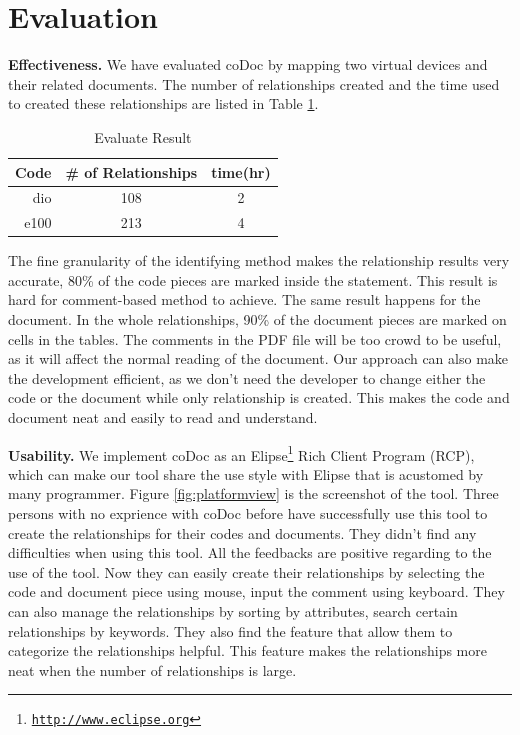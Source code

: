 \documentclass[11pt,letterpaper,oneside]{article}
\begin{document}
\section{Evaluation}
\label{sec:evaluation}
\textbf{Effectiveness.} We have evaluated coDoc by mapping two virtual devices and their related documents.
The number of relationships created and the time used to created these relationships are listed in Table \ref{table:evaluate}.

\begin{table}[th]
\caption{Evaluate Result}
\centering
\begin{tabular}{rcc}
\hline
Code & \# of Relationships & time(hr) \\
\hline
dio & 108 & 2 \\
e100  & 213 & 4\\
\hline
\end{tabular}
\label{table:evaluate}
\end{table}

The fine granularity of the identifying method makes the relationship results very accurate, 
80\% of the code pieces are marked inside the statement.
This result is hard for comment-based method to achieve.
The same result happens for the document.
In the whole relationships, 
90\% of the document pieces are marked on cells in the tables.
The comments in the PDF file will be too crowd to be useful,
as it will affect the normal reading of the document.
Our approach can also make the development efficient,
as we don't need the developer to change either the code or the document while only relationship is created.
This makes the code and document neat and easily to read and understand.

\noindent \textbf{Usability.} We implement coDoc as an Elipse\footnote{\texttt{\url{http://www.eclipse.org}}} Rich Client Program (RCP), 
which can make our tool share the use style with Elipse that is acustomed by many programmer.
Figure \ref{fig:platformview} is the screenshot of the tool.
Three persons with no exprience with coDoc before have successfully use this tool to create the relationships for their codes and documents.
They didn't find any difficulties when using this tool.
All the feedbacks are positive regarding to the use of the tool.
Now they can easily create their relationships by selecting the code and document piece using mouse, input the comment using keyboard.
They can also manage the relationships by sorting by attributes, search certain relationships by keywords.
They also find the feature that allow them to categorize the relationships helpful.
This feature makes the relationships more neat when the number of relationships is large.
\end{document}
